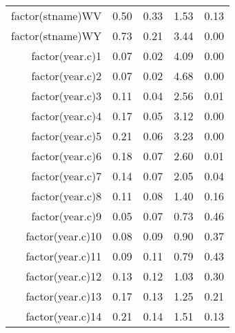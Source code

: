 \begin{table}[ht]
\begin{tabular}{rrrrr}
  factor(stname)WV & 0.50 & 0.33 & 1.53 & 0.13 \\ 
  factor(stname)WY & 0.73 & 0.21 & 3.44 & 0.00 \\ 
  factor(year.c)1 & 0.07 & 0.02 & 4.09 & 0.00 \\ 
  factor(year.c)2 & 0.07 & 0.02 & 4.68 & 0.00 \\ 
  factor(year.c)3 & 0.11 & 0.04 & 2.56 & 0.01 \\ 
  factor(year.c)4 & 0.17 & 0.05 & 3.12 & 0.00 \\ 
  factor(year.c)5 & 0.21 & 0.06 & 3.23 & 0.00 \\ 
  factor(year.c)6 & 0.18 & 0.07 & 2.60 & 0.01 \\ 
  factor(year.c)7 & 0.14 & 0.07 & 2.05 & 0.04 \\ 
  factor(year.c)8 & 0.11 & 0.08 & 1.40 & 0.16 \\ 
  factor(year.c)9 & 0.05 & 0.07 & 0.73 & 0.46 \\ 
  factor(year.c)10 & 0.08 & 0.09 & 0.90 & 0.37 \\ 
  factor(year.c)11 & 0.09 & 0.11 & 0.79 & 0.43 \\ 
  factor(year.c)12 & 0.13 & 0.12 & 1.03 & 0.30 \\ 
  factor(year.c)13 & 0.17 & 0.13 & 1.25 & 0.21 \\ 
  factor(year.c)14 & 0.21 & 0.14 & 1.51 & 0.13 \\ 
   \hline
\end{tabular}
\end{table}
